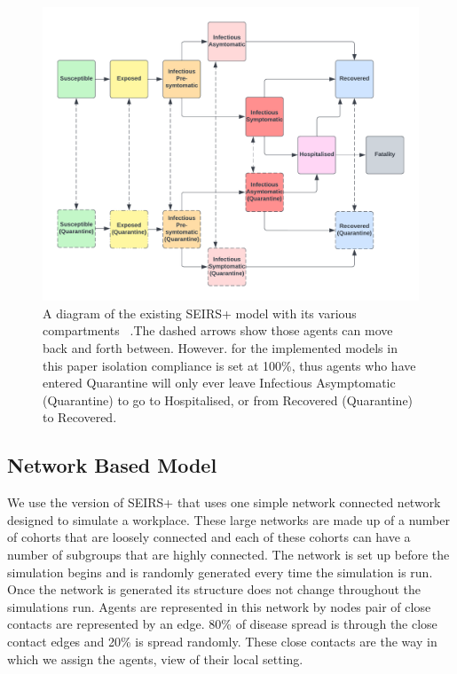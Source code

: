 \documentclass{article}
\begin{document}
\begin{figure}[h!]
\centering
\includegraphics[width=\textwidth]{SIR}
\caption{A diagram of the existing SEIRS+ model with its various compartments ~\cite{mcgee_2021}.The dashed arrows show those agents can move back and forth between. However. for the implemented models in this paper isolation compliance is set at 100\%, thus agents who have entered Quarantine will only ever leave Infectious Asymptomatic (Quarantine) to go to Hospitalised, or from Recovered (Quarantine) to Recovered.}
\end{figure}

\newpage


\subsection{Network Based Model}

We use the version of SEIRS+ that uses one simple network connected network designed to simulate a workplace. These large networks are made up of a number of cohorts that are loosely connected and each of these cohorts can have a number of subgroups that are highly connected. The network is set up before the simulation begins and is randomly generated every time the simulation is run. Once the network is generated its structure does not change throughout the simulations run.  Agents are represented in this network by nodes pair of close contacts are represented by an edge. 80\% of disease spread is through the close contact edges and 20\% is spread randomly. These close contacts are the way in which we assign the agents, view of their local setting.
\end{document}
